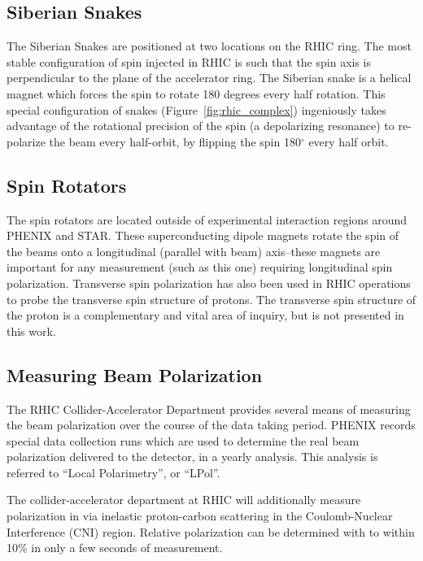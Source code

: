 \subsection{Siberian Snakes}
\label{sec:siberian_snakes}

The Siberian Snakes are positioned at two locations on the RHIC ring. The most
stable configuration of spin injected in RHIC is such that the spin axis is
perpendicular to the plane of the accelerator ring. The Siberian snake is a
helical magnet which forces the spin to rotate 180 degrees every half rotation.
This special configuration of snakes (Figure~\ref{fig:rhic_complex})
ingeniously takes advantage of the rotational precision of the spin (a
depolarizing resonance) to re-polarize the beam every half-orbit, by flipping
the spin 180$^\circ$ every half orbit.

\subsection{Spin Rotators}

The spin rotators are located outside of experimental interaction regions around
PHENIX and STAR. These superconducting dipole magnets rotate the spin of the
beams onto a longitudinal (parallel with beam) axis--these magnets are important
for any measurement (such as this one) requiring longitudinal spin polarization.
Transverse spin polarization has also been used in RHIC operations to probe the
transverse spin structure of protons. The transverse spin structure of the
proton is a complementary and vital area of inquiry, but is not presented in
this work. 

\subsection{Measuring Beam Polarization}

The RHIC Collider-Accelerator Department provides several means of measuring the
beam polarization over the course of the data taking period. PHENIX records
special data collection runs which are used to determine the real beam
polarization delivered to the detector, in a yearly analysis. This analysis is
referred to ``Local Polarimetry'', or ``LPol''.

The collider-accelerator department at RHIC will additionally measure
polarization in via inelastic proton-carbon scattering in the Coulomb-Nuclear
Interference (CNI) region. Relative polarization can be determined with to
within 10\% in only a few seconds of measurement. 

